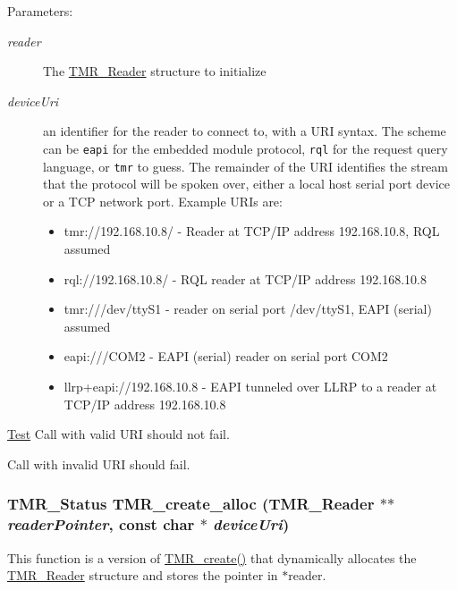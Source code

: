 \begin{Desc}
\item[Parameters:]
\begin{description}
\item[{\em reader}]The \hyperlink{struct_t_m_r___reader}{TMR\_\-Reader} structure to initialize \item[{\em deviceUri}]an identifier for the reader to connect to, with a URI syntax. The scheme can be {\tt eapi} for the embedded module protocol, {\tt rql} for the request query language, or {\tt tmr} to guess. The remainder of the URI identifies the stream that the protocol will be spoken over, either a local host serial port device or a TCP network port. Example URIs are:\begin{itemize}
\item tmr://192.168.10.8/ - Reader at TCP/IP address 192.168.10.8, RQL assumed\item rql://192.168.10.8/ - RQL reader at TCP/IP address 192.168.10.8\item tmr:///dev/ttyS1 - reader on serial port /dev/ttyS1, EAPI (serial) assumed\item eapi:///COM2 - EAPI (serial) reader on serial port COM2\item llrp+eapi://192.168.10.8 - EAPI tunneled over LLRP to a reader at TCP/IP address 192.168.10.8\end{itemize}
\end{description}
\end{Desc}
\begin{Desc}
\item[\hyperlink{test__test000001}{Test}]Call with valid URI should not fail. 

Call with invalid URI should fail. \end{Desc}
\hypertarget{group__reader_g3a75a6998463bfdf20242a3fb9c82427}{
\subsubsection[{TMR\_\-create\_\-alloc}]{\setlength{\rightskip}{0pt plus 5cm}TMR\_\-Status TMR\_\-create\_\-alloc ({\bf TMR\_\-Reader} $\ast$$\ast$ {\em readerPointer}, \/  const char $\ast$ {\em deviceUri})}}
\label{group__reader_g3a75a6998463bfdf20242a3fb9c82427}


This function is a version of \hyperlink{group__reader_g77b9edd8d948ab1e1d9b95bf546cc43e}{TMR\_\-create()} that dynamically allocates the \hyperlink{struct_t_m_r___reader}{TMR\_\-Reader} structure and stores the pointer in $\ast$reader.


